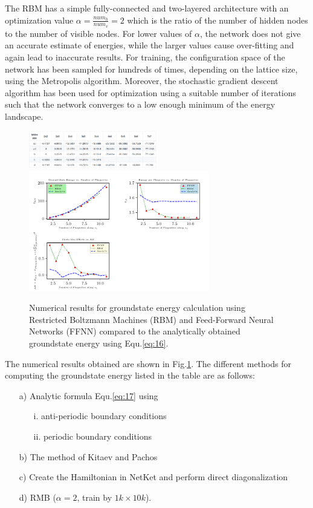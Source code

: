 \documentclass{article}
\begin{document}
The RBM has a simple fully-connected and two-layered architecture with an optimization value $\alpha = \frac{num_{h}}{num_{v}} = 2$ which is the ratio of the number of hidden nodes to the number of visible nodes. For lower values of $\alpha$, the network does not give an accurate estimate of energies, while the larger values cause over-fitting and again lead to inaccurate results. For training, the configuration space of the network has been sampled for hundreds of  times, depending on the lattice size, using the Metropolis algorithm. Moreover, the stochastic gradient descent algorithm has been used for optimization using a suitable number of iterations such that the network converges to a low enough minimum of the energy landscape.

\begin{figure}[!htb]
	\centering
	\includegraphics[width=0.5\textwidth]{./images/gs_tbl.png}
	\includegraphics[width=0.7\textwidth]{./images/plots.pdf}
	\caption{\label{tab:r_space} Numerical results for groundstate energy calculation using Restricted Boltzmann Machines (RBM) 
	and Feed-Forward Neural Networks (FFNN) compared to the analytically obtained groundstate energy using Equ.\hspace{0.2mm}\ref{eq:16}.} 
\end{figure}

The numerical results obtained are shown in Fig.\hspace{0.2mm}\ref{tab:r_space}. The different methods for computing the groundstate energy listed in the table are as follows:
\begin{enumerate}
	\item[a)] Analytic formula Equ.\hspace{0.2mm}\ref{eq:17} using
	\begin{itemize}
		\item[i.] anti-periodic boundary conditions
		\item[ii.] periodic boundary conditions
	\end{itemize}
	\item[b)] The method of Kitaev and Pachos \cite{Kitaev_2003} \cite{pachos_2012}
	\item[c)] Create the Hamiltonian in NetKet and perform direct diagonalization
	\item[d)] RMB ($\alpha =2$, train by $1k \times 10k$).
\end{enumerate}
\end{document}
